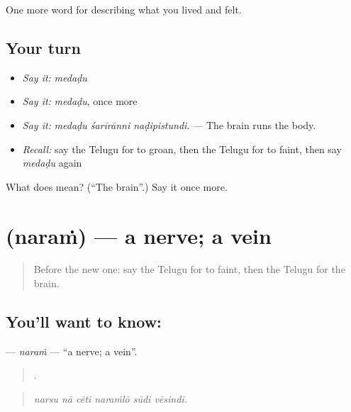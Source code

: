\begin{grammarlens}[title={What you've built}]
One more word for describing what you lived and felt.
\end{grammarlens}

\subsection*{Your turn}
\begin{itemize}
\raggedright
  \item \emph{Say it:} \emph{medaḍu}
  \item \emph{Say it:} \emph{medaḍu}, once more
  \item \emph{Say it:} \emph{medaḍu śarīrānni naḍipistundi.} — The brain runs the body.
  \item \emph{Recall:} say the Telugu for to groan, then the Telugu for to faint, then say \emph{medaḍu} again
\end{itemize}

\begin{tcolorbox}[breakable,colback=teal!4,colframe=teal!35!black,title={Before you move on}]
What does  mean? (\textquotedblleft{}The brain\textquotedblright{}.) Say it once more.
\end{tcolorbox}
\section[\texorpdfstring{\te{నరం} (naraṁ)}{నరం (naraṁ)}]{ (naraṁ) — a nerve; a vein}

\label{lesson:TE-C515-naram}



\begin{quote}
Before the new one: say the Telugu for to faint, then the Telugu for the brain.
\end{quote}

\subsection*{You'll want to know: }
\textbf{} — \emph{naraṁ} — \textquotedblleft{}a nerve; a vein\textquotedblright{}.

\begin{quote}
     .
\end{quote}

\begin{quote}
\emph{narsu nā cēti naraṁlō sūdi vēsindi.}
\end{quote}

